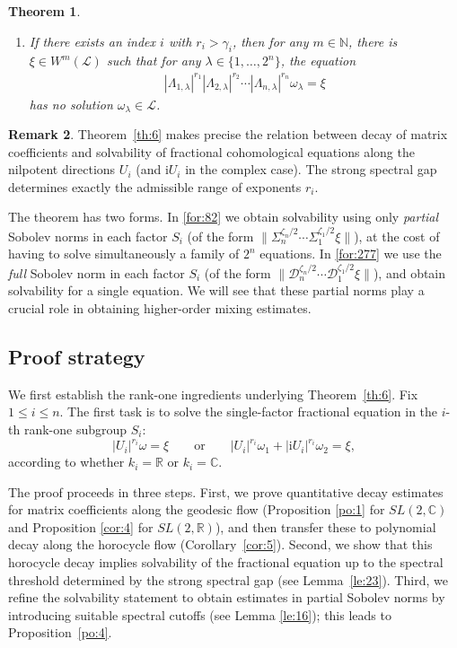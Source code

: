 \documentclass[11 pt]{amsart}
\newcommand{\NN}{\mathbb{N}}
\newcommand{\RR}{\mathbb{R}}
\newcommand{\CC}{\mathbb{C}}
\newtheorem{theorem}{Theorem}[section]
\theoremstyle{definition}
\newtheorem{remark}[theorem]{Remark}
\numberwithin{equation}{section}
\begin{document}
\begin{theorem}
\begin{enumerate}
  \item\label{for:17}  If there exists an index $i$ with $r_i>\gamma_i$, then for any $m\in\NN$, there is $\xi\in W^m(\mathcal{L})$ such that for any $\lambda\in\{1,\dots,2^n\}$, the equation
\begin{align*}
|\Lambda_{1,\lambda}|^{r_1}|\Lambda_{2,\lambda}|^{r_2}\cdots |\Lambda_{n,\lambda}|^{r_n}\omega_\lambda=\xi
\end{align*}
has no solution $\omega_\lambda\in\mathcal{L}$.
\end{enumerate}









\end{theorem}

\begin{remark}
Theorem~\ref{th:6} makes precise the relation between decay of matrix
coefficients and solvability of fractional cohomological equations along the
nilpotent directions $U_i$ (and $\mathrm{i}U_i$ in the complex case). The
strong spectral gap determines exactly the admissible range of exponents
$r_i$.



The theorem has two forms.
In \eqref{for:82} we obtain solvability using only \emph{partial} Sobolev norms in each factor $S_i$
(of the form $\|\Sigma_n^{\zeta_n/2}\cdots\Sigma_1^{\zeta_1/2}\xi\|$), at the
cost of having to solve simultaneously a family of $2^n$ equations. In
\eqref{for:277} we use the \emph{full} Sobolev norm in each factor $S_i$ (of the form $\|\mathcal{D}_n^{\zeta_n/2}\cdots\mathcal{D}_1^{\zeta_1/2}\xi\|$), and
obtain solvability for a single equation. We will see that these partial norms
play a crucial role in obtaining  higher-order mixing estimates.
\end{remark}



\subsection{Proof strategy}
We first establish the rank-one ingredients underlying Theorem~\ref{th:6}.
Fix $1\le i\le n$. The first task is to solve the single-factor fractional
equation in the $i$-th rank-one subgroup $S_i$:
\[
  |U_i|^{r_i}\omega=\xi
  \qquad\text{or}\qquad
  |U_i|^{r_i}\omega_1+|\mathrm{i}U_i|^{r_i}\omega_2=\xi,
\]
according to whether $k_i=\RR$ or $k_i=\CC$.

The proof proceeds in three steps. First, we prove quantitative decay
estimates for matrix coefficients along the geodesic flow (Proposition \ref{po:1} for $SL(2,\CC)$ and Proposition \ref{cor:4} for $SL(2,\RR)$), and then transfer
these to polynomial decay along the horocycle flow (Corollary~\ref{cor:5}). Second, we show that this
horocycle decay implies solvability of the fractional equation up to the
spectral threshold determined by the strong spectral gap (see Lemma~\ref{le:23}). Third, we refine the solvability statement to obtain estimates in partial
Sobolev norms by introducing suitable spectral cutoffs (see Lemma \ref{le:16}); this leads to
Proposition~\ref{po:4}.
\end{document}

